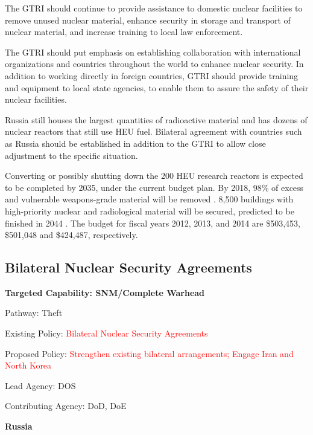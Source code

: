 \documentclass{report}
\begin{document}

The GTRI should continue to provide assistance to domestic nuclear facilities to remove unused nuclear material, enhance security in storage and transport of nuclear material, and increase training to local law enforcement. 

The GTRI should put emphasis on establishing collaboration with international organizations and countries throughout the world to enhance nuclear security.  In addition to working directly in foreign countries, GTRI should provide training and equipment to local state agencies, to enable them to assure the safety of their nuclear facilities. 

Russia still houses the largest quantities of radioactive material and has dozens of nuclear reactors that still use HEU fuel.  Bilateral agreement with countries such as Russia should be established in addition to the GTRI to allow close adjustment to the specific situation. 


Converting or possibly shutting down the 200 HEU research reactors is expected to be completed by 2035, under the current budget plan.  By 2018, 98\% of excess and vulnerable weapons-grade material will be removed \cite{Position2014}. 8,500 buildings   with high-priority nuclear and radiological material will be secured, predicted to be finished in 2044 \cite{Roth2014}. The budget for fiscal years 2012, 2013, and 2014 are \$503,453, \$501,048 and \$424,487, respectively. 






\subsection{Bilateral Nuclear Security Agreements}



\bfseries Targeted Capability: SNM/Complete Warhead

Pathway: Theft

Existing Policy:  \textcolor{red}{Bilateral Nuclear Security Agreements}

Proposed Policy:  \textcolor{red}{Strengthen existing bilateral arrangements; Engage Iran and North Korea}

Lead Agency: DOS


Contributing Agency: DoD, DoE  \normalfont



\textbf{Russia}
\end{document}
